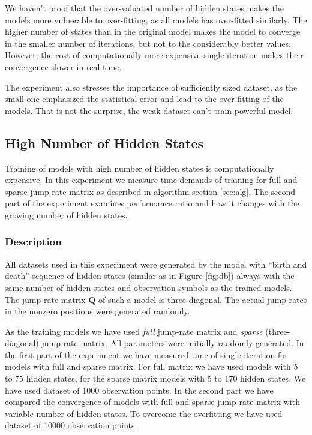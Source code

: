 \documentclass[thesis=M,english]{FITthesis}[2012/10/20]
\newcommand{\matr}[1]{\mathbf{#1}}
\begin{document}
We haven't proof that the over-valuated number of hidden states makes the models more vulnerable to over-fitting, as all models has over-fitted similarly. The higher number of states than in the original model makes the model to converge in the smaller number of iterations, but not to the considerably better values. However, the cost of computationally more expensive single iteration makes their convergence slower in real time.

The experiment also stresses the importance of sufficiently sized dataset, as the small one emphasized the statistical error and lead to the over-fitting of the models. That is not the surprise, the weak dataset can't train powerful model. 

\subsection{High Number of Hidden States}\label{sec:high}

Training of models with high number of hidden states is computationally expensive. In this experiment we measure time demands of training for full and sparse jump-rate matrix as described in algorithm section \ref{sec:alg}. The second part of the experiment examines performance ratio and how it changes with the growing number of hidden states. 

\subsubsection*{ Description }

All datasets used in this experiment were generated by the model with ``birth and death'' sequence of hidden states (similar as in Figure \ref{fig:db}) always with the same number of hidden states and observation symbols as the trained models. The jump-rate matrix $\matr{Q}$ of such a model is three-diagonal. The actual jump rates in the nonzero positions were generated randomly.

As the training models we have used \textit{full} jump-rate matrix and \textit{sparse} (three-diagonal) jump-rate matrix. All parameters were initially randomly generated. In the first part of the experiment we have measured time of single iteration for models with full and sparse matrix.
For full matrix we have used models with 5 to 75 hidden states, for the sparse matrix models with 5 to 170 hidden states. We have used dataset of 1000 observation points.
 In the second part we have compared the convergence of models with full and sparse jump-rate matrix with variable number of hidden states. To overcome the overfitting we have used dataset of 10000 observation points.    
\end{document}
